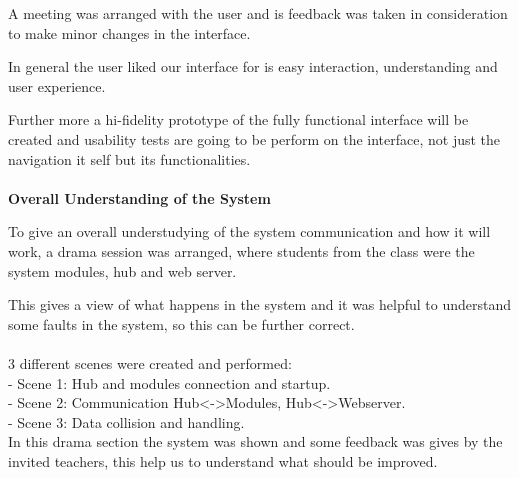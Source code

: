 A meeting was arranged with the user and is feedback was taken in consideration to make minor changes in the interface.

In general the user liked our interface for is easy interaction, understanding and user experience.

Further more a hi-fidelity prototype of the fully functional interface will be created and usability tests are going to be perform on the interface, not just the navigation it self but its functionalities.
\\
\\\textbf{Overall Understanding of the System} 

To give an overall understudying of the system communication and how it will work, a drama session was arranged, where students from the class were the system modules, hub and web server.

This gives a view of what happens in the system and it was helpful to understand some faults in the system, so this can be further correct.
\\
\\3 different scenes were created and performed:\\
- Scene 1: Hub and modules connection and startup.\\
- Scene 2: Communication Hub<->Modules, Hub<->Webserver.\\
- Scene 3: Data collision and handling.\\

In this drama section the system was shown and some feedback was gives by the invited teachers, this help us to understand what should be improved.